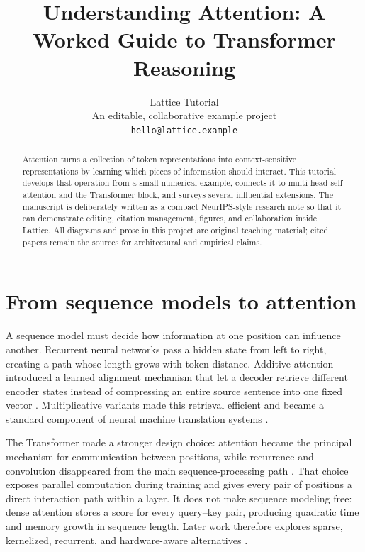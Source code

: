\documentclass{article}
\title{Understanding Attention: A Worked Guide to Transformer Reasoning}
\author{Lattice Tutorial \\
An editable, collaborative example project \\
\texttt{hello@lattice.example}}
\begin{document}
\maketitle

\begin{abstract}
Attention turns a collection of token representations into context-sensitive representations by learning which pieces of information should interact.
This tutorial develops that operation from a small numerical example, connects it to multi-head self-attention and the Transformer block, and surveys several influential extensions.
The manuscript is deliberately written as a compact NeurIPS-style research note so that it can demonstrate editing, citation management, figures, and collaboration inside Lattice.
All diagrams and prose in this project are original teaching material; cited papers remain the sources for architectural and empirical claims.
\end{abstract}

\section{From sequence models to attention}

A sequence model must decide how information at one position can influence another.
Recurrent neural networks pass a hidden state from left to right, creating a path whose length grows with token distance.
Additive attention introduced a learned alignment mechanism that let a decoder retrieve different encoder states instead of compressing an entire source sentence into one fixed vector \citep{bahdanau2015neural}.
Multiplicative variants made this retrieval efficient and became a standard component of neural machine translation systems \citep{luong2015effective}.

The Transformer made a stronger design choice: attention became the principal mechanism for communication between positions, while recurrence and convolution disappeared from the main sequence-processing path \citep{vaswani2017attention}.
That choice exposes parallel computation during training and gives every pair of positions a direct interaction path within a layer.
It does not make sequence modeling free: dense attention stores a score for every query--key pair, producing quadratic time and memory growth in sequence length.
Later work therefore explores sparse, kernelized, recurrent, and hardware-aware alternatives \citep{tay2022efficient,choromanski2021rethinking,dao2022flashattention}.
\end{document}
